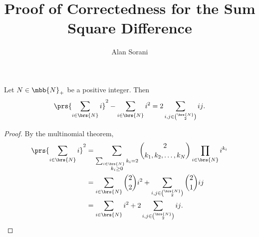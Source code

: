 \documentclass[10pt]{article}
\author{Alan Sorani}
\title{Proof of Correctedness for the Sum Square Difference}
\begin{document}
\maketitle

\begin{proposition*}
Let $N \in \mbb{N}_+$ be a positive integer.
Then
\begin{align*}
	\prs{\sum_{i \in \brs{N}} i}^2 - \sum_{i \in \brs{N}} i^2 = 2 \sum_{i,j \in \binom{\brs{N}}{2}} ij \text{.}
\end{align*}
\end{proposition*}

\begin{proof}
	By the multinomial theorem,
	\begin{align*}
	\prs{\sum_{i \in \brs{N}} i}^2 &= \sum_{\substack{\sum_{i\in\brs{N}} k_i = 2 \\ k_i \geq 0}} \binom{2}{k_1,k_2,\ldots,k_N} \prod_{i \in \brs{N}} i^{k_i}
	\\&=
	\sum_{i \in \brs{N}} \binom{2}{2} i^2 + \sum_{\substack{i,j \in \binom{\brs{N}}{2}}} \binom{2}{1} ij
	\\&=
	\sum_{i \in \brs{N}} i^2 + 2 \sum_{i,j \in \binom{\brs{N}}{2}} ij \text{.}
	\end{align*}
\end{proof}
\end{document}
